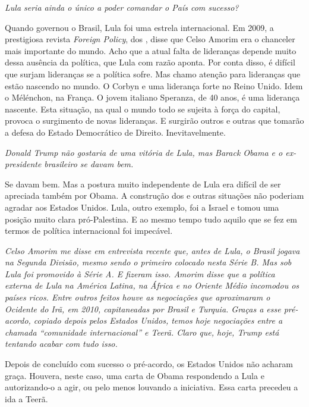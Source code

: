 \itshape
 Lula seria ainda o único a poder comandar o País com
sucesso?

\normalfont 
Quando governou o Brasil, Lula foi uma estrela
internacional. Em 2009, a prestigiosa revista \emph{Foreign Policy}, dos
, disse que Celso Amorim era o chanceler mais importante do mundo.
Acho que a atual falta de lideranças depende muito dessa ausência da
política, que Lula com razão aponta. Por conta disso, é difícil que
surjam lideranças se a política sofre. Mas chamo atenção para lideranças
que estão nascendo no mundo. O Corbyn e uma liderança forte no Reino
Unido. Idem o Mélénchon, na França. O jovem italiano Speranza, de 40
anos, é uma liderança nascente. Esta situação, na qual o mundo todo se
sujeita à força do capital, provoca o surgimento de novas lideranças. E
surgirão outros e outras que tomarão a defesa do Estado Democrático de
Direito. Inevitavelmente.

\itshape
 Donald Trump não gostaria de uma vitória de Lula, mas
Barack Obama e o ex-presidente brasileiro se davam bem.

\normalfont 
Se davam bem. Mas a postura muito independente de Lula
era difícil de ser apreciada também por Obama. A construção dos  e
outras situações não poderiam agradar aos Estados Unidos. Lula, outro
exemplo, foi a Israel e tomou uma posição muito clara pró-Palestina. E
ao mesmo tempo tudo aquilo que se fez em termos de política
internacional foi impecável.

\itshape
 Celso Amorim me disse em entrevista recente que, antes
de Lula, o Brasil jogava na Segunda Divisão, mesmo sendo o primeiro
colocado nesta Série B. Mas sob Lula foi promovido à Série A. E fizeram
isso. Amorim disse que a política externa de Lula na América Latina, na
África e no Oriente Médio incomodou os países ricos. Entre outros feitos
houve as negociações que aproximaram o Ocidente do Irã, em 2010,
capitaneadas por Brasil e Turquia. Graças a esse pré-acordo, copiado
depois pelos Estados Unidos, temos hoje negociações entre a chamada
``comunidade internacional'' e Teerã. Claro que, hoje, Trump está
tentando acabar com tudo isso.

\normalfont 
Depois de concluído com sucesso o pré-acordo, os Estados
Unidos não acharam graça. Houvera, neste caso, uma carta de Obama
respondendo a Lula e autorizando-o a agir, ou pelo menos louvando a
iniciativa. Essa carta precedeu a ida a Teerã.


